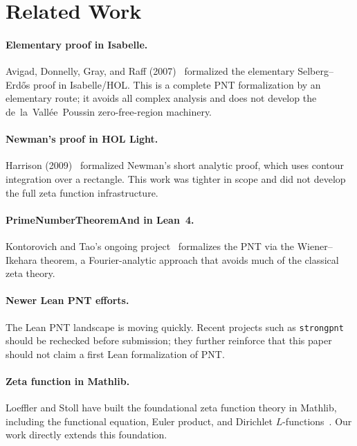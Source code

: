 \documentclass[11pt,a4paper]{article}
\theoremstyle{remark}
\begin{document}
\section{Related Work}

\paragraph{Elementary proof in Isabelle.}
Avigad, Donnelly, Gray, and Raff (2007)~\cite{avigad2007pnt} formalized the
elementary Selberg--Erd\H{o}s proof in Isabelle/HOL.  This is a complete PNT
formalization by an elementary route; it avoids all complex analysis and does
not develop the de~la~Vall\'ee~Poussin zero-free-region machinery.

\paragraph{Newman's proof in HOL Light.}
Harrison (2009)~\cite{harrison2009pnt} formalized Newman's short analytic
proof, which uses contour integration over a rectangle. This work was
tighter in scope and did not develop the full zeta function infrastructure.

\paragraph{PrimeNumberTheoremAnd in Lean~4.}
Kontorovich and Tao's ongoing project~\cite{pntand} formalizes the PNT
via the Wiener--Ikehara theorem, a Fourier-analytic approach that avoids
much of the classical zeta theory.

\paragraph{Newer Lean PNT efforts.}
The Lean PNT landscape is moving quickly.  Recent projects such as
\texttt{strongpnt}~\cite{strongpnt} should be rechecked before submission;
they further reinforce that this paper should not claim a first Lean
formalization of PNT.

\paragraph{Zeta function in Mathlib.}
Loeffler and Stoll have built the foundational zeta function theory in
Mathlib, including the functional equation, Euler product, and Dirichlet
$L$-functions~\cite{mathlib}. Our work directly extends this foundation.
\end{document}
